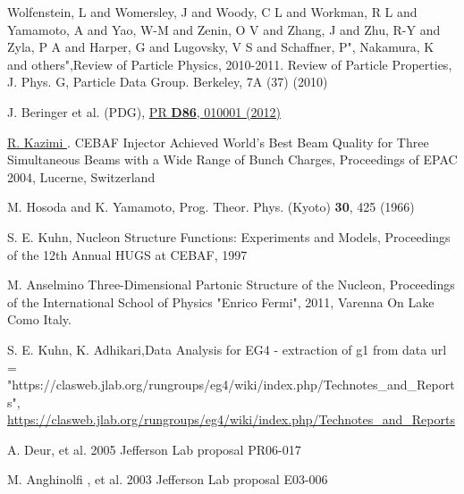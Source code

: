 Wolfenstein, L and Womersley, J and Woody, C L and Workman, R L and Yamamoto, A and Yao, W-M and Zenin, O V and Zhang, J and Zhu, R-Y and Zyla, P A and Harper, G and Lugovsky, V S and Schaffner, P",
      Nakamura, K and others",Review of Particle Physics, 2010-2011. Review of Particle Properties,
      J. Phys. G, Particle Data Group. Berkeley, 7A (37) (2010)

 J. Beringer et al. (PDG), \href{http://pdg.lbl.gov/2012/reviews/rpp2012-rev-n-delta-resonances.pdf}{PR \textbf{D86}, 010001 (2012)}


\href{http://accelconf.web.cern.ch/AccelConf/e04/PAPERS/TUPLT164.PDF}  {R. Kazimi \etal}. CEBAF Injector Achieved World's Best Beam Quality for Three Simultaneous Beams with a Wide Range of Bunch Charges, Proceedings of EPAC 2004, Lucerne, Switzerland

 M. Hosoda and K. Yamamoto, Prog. Theor. Phys. (Kyoto) \textbf{30}, 425 (1966)

 S. E. Kuhn, Nucleon Structure Functions: Experiments and Models, Proceedings of the 12th Annual HUGS at CEBAF, 1997

 M. Anselmino \etal Three-Dimensional Partonic Structure of the Nucleon, Proceedings of the International School of Physics "Enrico Fermi", 2011, Varenna On Lake Como Italy.%

 S. E. Kuhn, K. Adhikari,Data Analysis for EG4 - extraction of g1 from data  	url = "{https://clasweb.jlab.org/rungroups/eg4/wiki/index.php/Technotes\_and\_Reports}", \href{https://userweb.jlab.org/\~kuhn/EG4/EG4\_analysis.pdf}{https://clasweb.jlab.org/rungroups/eg4/wiki/index.php/Technotes\_and\_Reports}


 A. Deur, et al. 2005 Jefferson Lab proposal PR06-017  %

 M. Anghinolfi , et al. 2003 Jefferson Lab proposal E03-006 %

